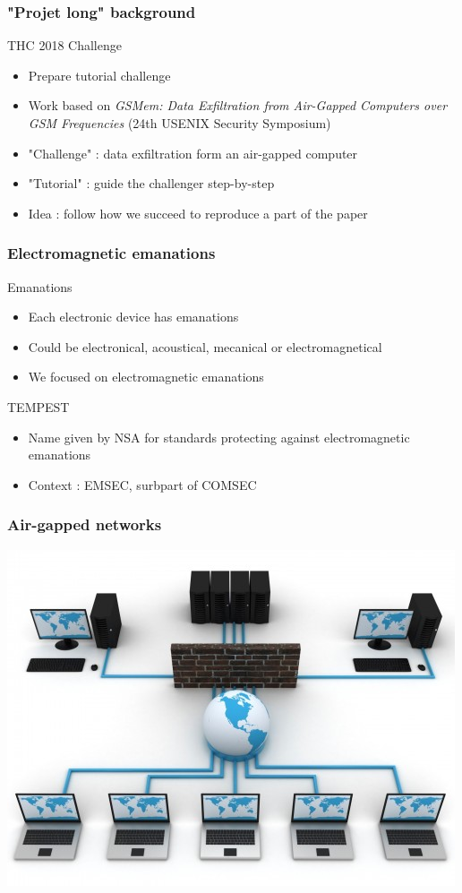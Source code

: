 \begin{frame}
\frametitle{"Projet long" background}
\begin{block}{THC 2018 Challenge}
\begin{itemize}
\item Prepare tutorial challenge
\item Work based on \textit{GSMem: Data Exfiltration from Air-Gapped 
Computers over GSM Frequencies} (24th USENIX Security Symposium)
\item "Challenge" : data exfiltration form an air-gapped computer
\item "Tutorial" : guide the challenger step-by-step
\item Idea : follow how we succeed to reproduce a part of the paper
\end{itemize}
\end{block}
\end{frame}

\begin{frame}
\frametitle{Electromagnetic emanations}
\begin{block}{Emanations}
\begin{itemize}
\item Each electronic device has emanations
\item Could be electronical, acoustical, mecanical or electromagnetical
\item We focused on electromagnetic emanations
\end{itemize}
\end{block}

\begin{block}{TEMPEST}
\begin{itemize}
\item Name given by NSA for standards protecting against electromagnetic emanations
\item Context : EMSEC, surbpart of COMSEC
\end{itemize}
\end{block}
\end{frame}


\begin{frame}
\frametitle{Air-gapped networks}
\centering \includegraphics[scale=.5]{images/network.jpg}
\end{frame}

